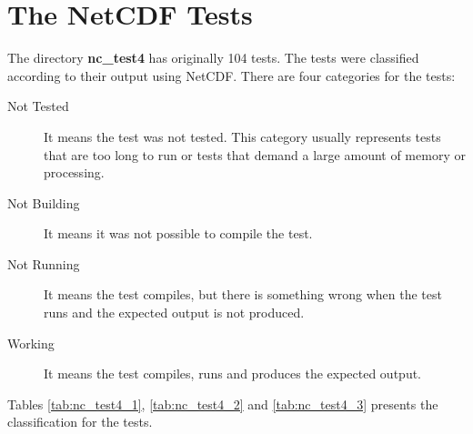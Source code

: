 \chapter{The NetCDF Tests}

\tab
The directory \textbf{nc\_test4} has originally 104 tests. The tests were classified according to their output using NetCDF. There are four categories for the tests:

\begin{description}

\item[Not Tested] It means the test was not tested. This category usually represents tests that are too long to run or tests that demand a large amount of memory or processing.

\item[Not Building] It means it was not possible to compile the test.

\item[Not Running] It means the test compiles, but there is something wrong when the test runs and the expected output is not produced.

\item[Working] It means the test compiles, runs and produces the expected output.

\end{description}

Tables \ref{tab:nc_test4_1}, \ref{tab:nc_test4_2} and \ref{tab:nc_test4_3} presents the classification for the tests.
